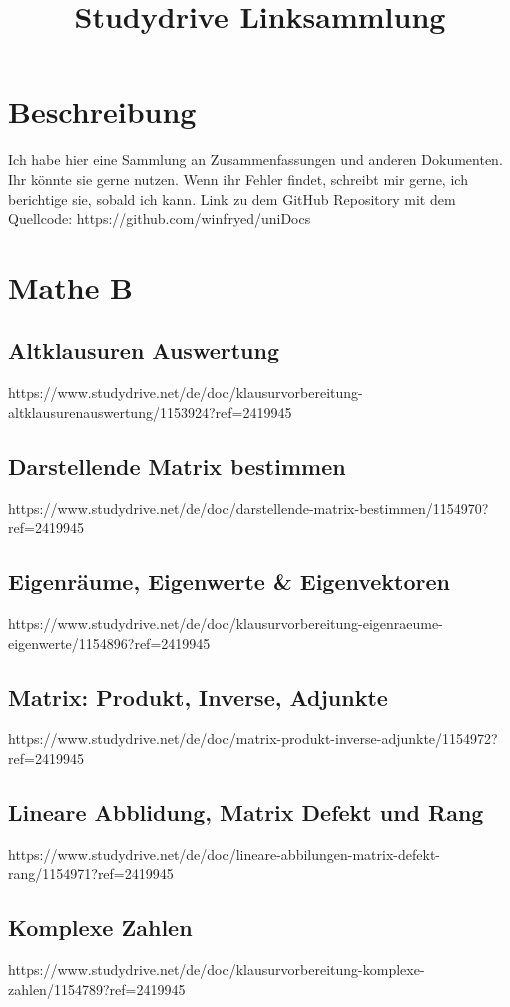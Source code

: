 \documentclass[11pt]{article}
\begin{document}
    \title{Studydrive Linksammlung}
    \section{Beschreibung}
    Ich habe hier eine Sammlung an Zusammenfassungen und anderen Dokumenten.
    Ihr könnte sie gerne nutzen.
    Wenn ihr Fehler findet, schreibt mir gerne, ich berichtige sie, sobald ich kann.\newline
    Link zu dem GitHub Repository mit dem Quellcode: https://github.com/winfryed/uniDocs


    \section{Mathe B}
    \subsection{Altklausuren Auswertung}
    https://www.studydrive.net/de/doc/klausurvorbereitung-altklausurenauswertung/1153924?ref=2419945
    \subsection{Darstellende Matrix bestimmen}
    https://www.studydrive.net/de/doc/darstellende-matrix-bestimmen/1154970?ref=2419945
    \subsection{Eigenräume, Eigenwerte & Eigenvektoren}
    https://www.studydrive.net/de/doc/klausurvorbereitung-eigenraeume-eigenwerte/1154896?ref=2419945
    \subsection{Matrix: Produkt, Inverse, Adjunkte}
    https://www.studydrive.net/de/doc/matrix-produkt-inverse-adjunkte/1154972?ref=2419945
    \subsection{Lineare Abblidung, Matrix Defekt und Rang}
    https://www.studydrive.net/de/doc/lineare-abbilungen-matrix-defekt-rang/1154971?ref=2419945
    \subsection{Komplexe Zahlen}
    https://www.studydrive.net/de/doc/klausurvorbereitung-komplexe-zahlen/1154789?ref=2419945
\end{document}
